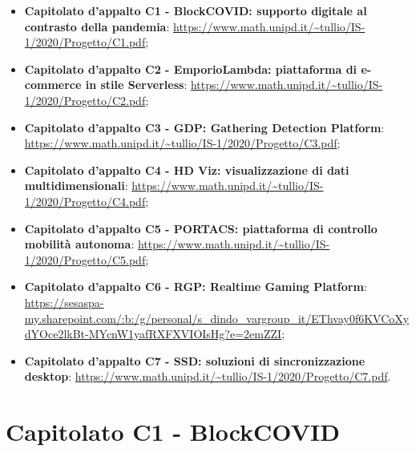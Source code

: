 \documentclass{article}
\begin{document}
\begin{itemize}
  \item \textbf{Capitolato d'appalto C1 - BlockCOVID: supporto digitale al contrasto della pandemia}: \url{https://www.math.unipd.it/~tullio/IS-1/2020/Progetto/C1.pdf};
  \item \textbf{Capitolato d'appalto C2 - EmporioLambda: piattaforma di e-commerce in stile Serverless}: \url{https://www.math.unipd.it/~tullio/IS-1/2020/Progetto/C2.pdf};
  \item \textbf{Capitolato d'appalto C3 - GDP: Gathering Detection Platform}: \url{https://www.math.unipd.it/~tullio/IS-1/2020/Progetto/C3.pdf};
  \item \textbf{Capitolato d'appalto C4 - HD Viz: visualizzazione di dati multidimensionali}: \url{https://www.math.unipd.it/~tullio/IS-1/2020/Progetto/C4.pdf};
  \item \textbf{Capitolato d'appalto C5 - PORTACS: piattaforma di controllo mobilità autonoma}: \url{https://www.math.unipd.it/~tullio/IS-1/2020/Progetto/C5.pdf};
  \item \textbf{Capitolato d'appalto C6 - RGP: Realtime Gaming Platform}: \url{https://sesaspa-my.sharepoint.com/:b:/g/personal/s_dindo_vargroup_it/EThvay0f6KVCoXydYOce2lkBt-MYcnW1yafRXFXVIOIsHg?e=2emZZI};
  \item \textbf{Capitolato d'appalto C7 - SSD: soluzioni di sincronizzazione desktop}: \url{https://www.math.unipd.it/~tullio/IS-1/2020/Progetto/C7.pdf}.
\end{itemize}

\newpage
\section{Capitolato C1 - BlockCOVID}
\label{sec:c1}

\end{document}
